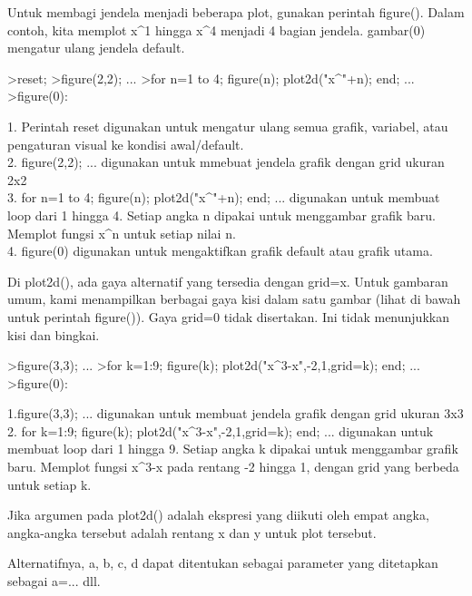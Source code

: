 \documentclass{article}
\begin{document}
\begin{eulernotebook}
\begin{eulercomment}
\begin{eulercomment}
\begin{eulercomment}
\begin{eulercomment}
\begin{eulercomment}
\begin{eulercomment}
\begin{eulercomment}
Untuk membagi jendela menjadi beberapa plot, gunakan perintah
figure(). Dalam contoh, kita memplot x\textasciicircum{}1 hingga x\textasciicircum{}4 menjadi 4 bagian
jendela. gambar(0) mengatur ulang jendela default.
\end{eulercomment}
\begin{eulerprompt}
>reset;
>figure(2,2); ...
>for n=1 to 4; figure(n); plot2d("x^"+n); end; ...
>figure(0):
\end{eulerprompt}
\begin{eulercomment}
1. Perintah reset digunakan untuk mengatur ulang semua grafik,
variabel, atau pengaturan visual ke kondisi awal/default.\\
2. figure(2,2); ... digunakan untuk mmebuat jendela grafik dengan grid
ukuran 2x2\\
3. for n=1 to 4; figure(n); plot2d("x\textasciicircum{}"+n); end; ... digunakan untuk
membuat loop dari 1 hingga 4. Setiap angka n dipakai untuk menggambar
grafik baru. Memplot fungsi x\textasciicircum{}n untuk setiap nilai n.\\
4. figure(0) digunakan untuk mengaktifkan grafik default atau grafik
utama.

Di plot2d(), ada gaya alternatif yang tersedia dengan grid=x. Untuk
gambaran umum, kami menampilkan berbagai gaya kisi dalam satu gambar
(lihat di bawah untuk perintah figure()). Gaya grid=0 tidak
disertakan. Ini tidak menunjukkan kisi dan bingkai.
\end{eulercomment}
\begin{eulerprompt}
>figure(3,3); ...
>for k=1:9; figure(k); plot2d("x^3-x",-2,1,grid=k); end; ...
>figure(0):
\end{eulerprompt}
\begin{eulercomment}
1.figure(3,3); ... digunakan untuk membuat jendela grafik dengan grid
ukuran 3x3\\
2. for k=1:9; figure(k); plot2d("x\textasciicircum{}3-x",-2,1,grid=k); end; ...
digunakan untuk membuat loop dari 1 hingga 9. Setiap angka k dipakai
untuk menggambar grafik baru. Memplot fungsi x\textasciicircum{}3-x pada rentang -2
hingga 1, dengan grid yang berbeda untuk setiap k.

Jika argumen pada plot2d() adalah ekspresi yang diikuti oleh empat
angka, angka-angka tersebut adalah rentang x dan y untuk plot
tersebut.

Alternatifnya, a, b, c, d dapat ditentukan sebagai parameter yang
ditetapkan sebagai a=... dll.


\end{eulercomment}
\end{eulercomment}
\end{eulercomment}
\end{eulercomment}
\end{eulercomment}
\end{eulercomment}
\end{eulercomment}
\end{eulernotebook}
\end{document}
